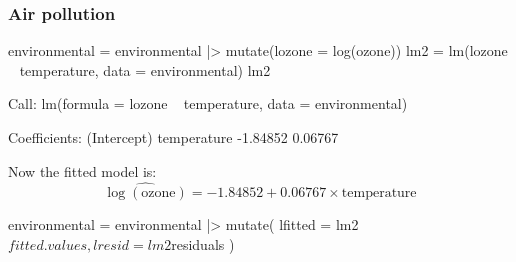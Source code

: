 \documentclass[a4paper]{article}
\begin{document}
\subsubsection{Air pollution}
\begin{Schunk}
\begin{Sinput}
environmental = environmental |> 
  mutate(lozone = log(ozone))
lm2 = lm(lozone ~ temperature, data = environmental)
lm2
\end{Sinput}
\begin{Soutput}

Call:
lm(formula = lozone ~ temperature, data = environmental)

Coefficients:
(Intercept)  temperature  
   -1.84852      0.06767  
\end{Soutput}
\end{Schunk}
Now the fitted model is:
\[
	\widehat{\log(\text{ozone})} = -1.84852 + 0.06767\times\text{temperature}
\]
\begin{Schunk}
\begin{Sinput}
environmental = environmental |> 
  mutate(
    lfitted = lm2$fitted.values,
    lresid = lm2$residuals
  )
\end{Sinput}
\end{Schunk}
\end{document}

